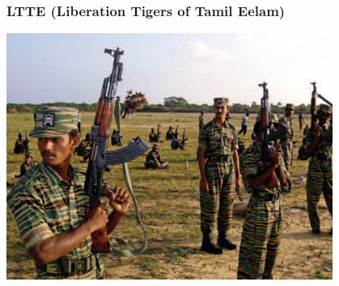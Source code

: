 \documentclass[aspectratio=43]{beamer}
\begin{document}
\begin{frame}
\frametitle{LTTE (Liberation Tigers of Tamil Eelam)}
\centering

\includegraphics[width = 0.8\textwidth]{img/ltte}

\end{frame}
\end{document}
